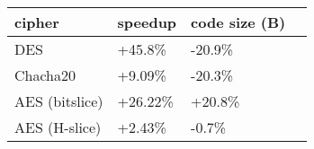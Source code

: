 \centering
  \begin{tabular}{|l K{3cm}|K{3cm}|K{3cm}|}
    \hline
    \textbf{cipher} & \textbf{speedup} & \textbf{code size (B)}\\
    \hline
    DES & +45.8\% & -20.9\% \\
    \hline
    Chacha20 & +9.09\% & -20.3\% \\
    \hline
    AES (bitslice) & +26.22\% & +20.8\% \\
    \hline
    AES (H-slice) & +2.43\% & -0.7\% \\
    \hline
\end{tabular}
